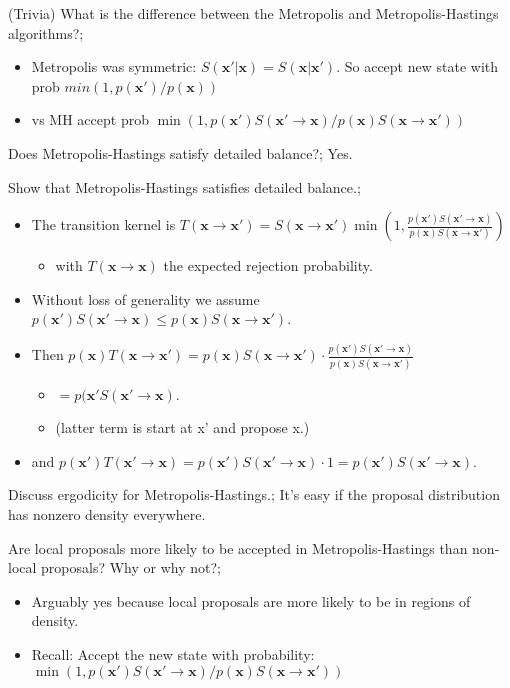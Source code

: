 \documentclass{article}
\begin{document}
(Trivia) What is the difference between the Metropolis and Metropolis-Hastings algorithms?; \begin{itemize} \item Metropolis was symmetric: $S(\mathbf{x'|x}) = S(\mathbf{x|x'})$. So accept new state with prob $min(1, p(\mathbf{x'})/p(\mathbf{x}))$  \item vs MH accept prob $\min (1, p(\mathbf{x'})S(\mathbf{x'\rightarrow x})/p(\mathbf{x})S(\mathbf{x}\rightarrow \mathbf{x'}))$ \end{itemize} 

Does Metropolis-Hastings satisfy detailed balance?; Yes.

Show that Metropolis-Hastings satisfies detailed balance.; \begin{itemize} \item The transition kernel is $T(\mathbf{x}\rightarrow \mathbf{x'}) = S(\mathbf{x}\rightarrow \mathbf{x'})\min(1, \frac{p(\mathbf{x'})S(\mathbf{x'\rightarrow x})}{p(\mathbf{x})S(\mathbf{x\rightarrow x'})})$ \begin{itemize} \item with $T(\mathbf{x\rightarrow x})$ the expected rejection probability. \end{itemize} \item Without loss of generality we assume $p(\mathbf{x'})S(\mathbf{x'}\rightarrow \mathbf{x}) \leq p(\mathbf{x})S(\mathbf{x}\rightarrow \mathbf{x'})$. \item Then $p(\mathbf{x})T(\mathbf{x}\rightarrow\mathbf{x'}) = p(\mathbf{x})S(\mathbf{x}\rightarrow\mathbf{x'})\cdot \frac{p(\mathbf{x'})S(\mathbf{x'}\rightarrow \mathbf{x})}{p(\mathbf{x})S(\mathbf{x}\rightarrow\mathbf{x'})}$\begin{itemize} \item $= p(\mathbf{x'}S(\mathbf{x'}\rightarrow \mathbf{x})$. \item (latter term is start at x' and propose x.) \end{itemize} \item and $p(\mathbf{x'})T(\mathbf{x'}\rightarrow \mathbf{x}) = p(\mathbf{x'})S(\mathbf{x'}\rightarrow \mathbf{x})\cdot 1 = p(\mathbf{x'})S(\mathbf{x'}\rightarrow \mathbf{x})$. \end{itemize}

Discuss ergodicity for Metropolis-Hastings.; It's easy if the proposal distribution has nonzero density everywhere.

Are local proposals more likely to be accepted in Metropolis-Hastings than non-local proposals? Why or why not?; \begin{itemize} \item Arguably yes because local proposals are more likely to be in regions of density. \item Recall: Accept the new state with probability: $\min (1, p(\mathbf{x'})S(\mathbf{x'\rightarrow x})/p(\mathbf{x})S(\mathbf{x}\rightarrow \mathbf{x'}))$ \end{itemize} 
\end{document}
